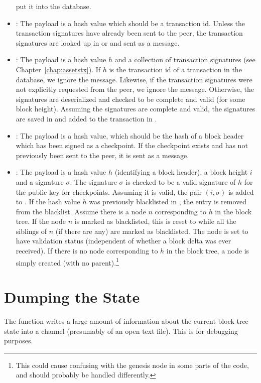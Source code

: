 \begin{itemize}
put it into the {} database.
\item {}: The payload is a hash value which should be a transaction id.
Unless the transaction signatures have already been sent to the peer, the transaction signatures
are looked up in {} or {} and sent as a {} message.
\item {}: The payload is a hash value $h$ and a collection of transaction signatures (see Chapter~\ref{chap:assetstx}).
If $h$ is the transaction id of a transaction in the {} database, we ignore the message.
Likewise, if the transaction signatures were not explicitly requested from the peer, we ignore the message.
Otherwise, the signatures are deserialized and checked to be complete and valid (for some block height).
Assuming the signatures are complete and valid, the signatures are saved in {}
and added to the transaction in {}.
\item {}: The payload is a hash value, which should be the hash of a block header which has
been signed as a checkpoint.
If the checkpoint exists and has not previously been sent to the peer,
it is sent as a {} message.
\item {}: The payload is a hash value $h$ (identifying a block header), a block height $i$ and a signature $\sigma$.
The signature $\sigma$ is checked to be a valid signature of $h$ for the public key for checkpoints.
Assuming it is valid, the pair $(i,\sigma)$ is added to {}.
If the hash value $h$ was previously blacklisted in {}, the entry is removed from the blacklist.
Assume there is a node $n$ corresponding to $h$ in the block tree.
If the node $n$ is marked as blacklisted, this is reset to {}
while all the siblings of $n$ (if there are any) are marked as blacklisted.
The node is set to have validation status {} (independent of whether a block delta was ever received).
If there is no node corresponding to $h$ in the block tree,
a node is simply created (with no parent).\footnote{This could cause confusing with the genesis node in some parts of the code, and should probably be handled differently.}
\end{itemize}

\section{Dumping the State}

The function {} writes a large amount of information about
the current block tree state into a channel (presumably of an open text file).
This is for debugging purposes.
